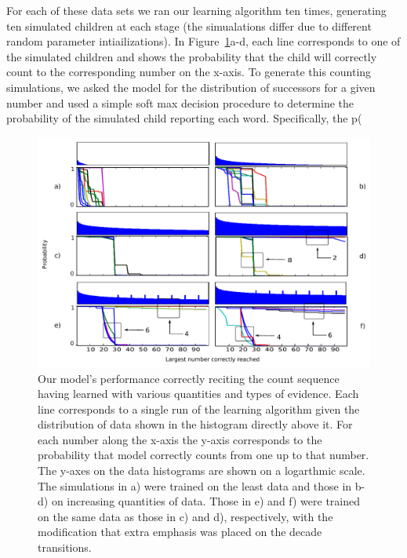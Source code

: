 \documentclass[10pt,letterpaper]{article}
\begin{document}
For each of these data sets we ran our learning algorithm ten times,
generating ten simulated children at each stage (the simualations
differ due to different random parameter intiailizations). In
Figure~\ref{fig:counting_grid}a-d, each line corresponds to one of the
simulated children and shows the probability that the child will
correctly count to the corresponding number on the x-axis. To generate
this counting simulations, we asked the model for the distribution of
successors for a given number and used a simple soft max decision procedure
to determine the probability of the simulated child reporting each
word. Specifically, the p(

\begin{figure}[t]
\includegraphics[width=\linewidth]{figures/counting_grid2}
\caption{Our model's performance correctly reciting the count sequence
  having learned with various quantities and types of evidence. Each
  line corresponds to a single run of the learning algorithm given the
  distribution of data shown in the histogram directly above it. For
  each number along the x-axis the y-axis corresponds to the
  probability that model correctly counts from one up to that
  number. The y-axes on the data histograms are shown on a logarthmic
  scale. The simulations in a) were trained on the least data and
  those in b-d) on increasing quantities of data. Those in e) and f)
  were trained on the same data as those in c) and d), respectively,
  with the modification that extra emphasis was placed on the decade
  transitions. \label{fig:counting_grid}}
\end{figure}
\end{document}

